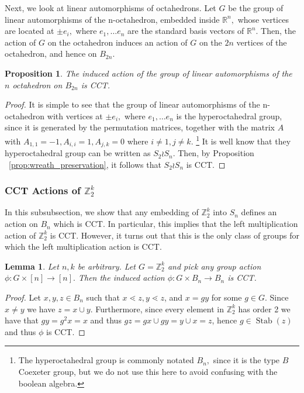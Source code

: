 \documentclass[10 pt]{amsart}
\theoremstyle{plain}
\newtheorem{prop}[thm]{Proposition}
\newtheorem{lem}[thm]{Lemma}
\theoremstyle{definition}
\theoremstyle{remark}
\numberwithin{equation}{section}
\newcommand\sssec{\subsubsection}
\newcommand\BR{{\mathbb R}}
\newcommand\BBZ{{\mathbb Z}}
\newcommand\BZ{{\mathbb Z}}
\def\Stab{\operatorname{Stab}}
\begin{document}
Next, we look at linear automorphisms of octahedrons. Let $G$ be the group of linear automorphisms of the n-octahedron, embedded inside $\BR^n,$ whose vertices are located at $\pm e_i,$ where $e_1,\ldots e_n$ are the standard basis vectors of $\BR^n.$ Then, the action of $G$ on the octahedron induces an action of $G$ on the $2n$ vertices of the octahedron, and hence on $B_{2n}.$

\begin{prop}
The induced action of the group of linear automorphisms of the $n$ octahedron on $B_{2n}$ is CCT.
\end{prop}
\begin{proof}
It is simple to see that the group of linear automorphisms of the n-octahedron with vertices at $\pm e_i,$ where $e_1,\ldots e_n$ is the hyperoctahedral group, since it is generated by the permutation matrices, together with the matrix $A$ with $A_{1,1} = -1,A_{i,i} = 1,A_{j,k} = 0$ where $i \neq 1, j \neq k.$ \footnote{The hyperoctahedral group is commonly notated $B_n,$ since it is the type $B$ Coexeter group, but we do not use this here to avoid confusing with the boolean algebra.} It is well know that they hyperoctahedral group can be written as $S_2 \wr S_n.$ Then, by Proposition ~\ref{prop:wreath_preservation}, it follows that $S_2 \wr S_n$ is CCT.
\end{proof}

\sssec{CCT Actions of $\BZ_2^k$}

In this subsubsection, we show that any embedding of $\BBZ_2^k$ into $S_n$ defines an action on $B_n$ which is CCT. In particular, this implies that the left multiplication action of $\BBZ_2^k$ is CCT. However, it turns out that this is the only class of groups for which the left multiplication action is CCT.

\begin{lem}
\label{lem:order_2_CCT}
Let $n,k$ be arbitrary. Let $G = \BBZ_2^k$ and pick any group action $\phi:G\times [n] \rightarrow [n].$ Then the induced action $\phi:G \times B_n \rightarrow B_n$ is CCT.
\end{lem}

\begin{proof}
Let $x,y,z\in B_n$ such that $x \lessdot z, y \lessdot z$, and  $x = gy$ for some $g\in G$.  Since $x\ne y$ we have $z=x\cup y$.  Furthermore, since every element in $\BBZ_2^k$ has order 2 we have that $gy = g^2x = x$ and thus $gz = gx\cup gy = y\cup x = z$, hence $g\in\Stab(z)$ and thus $\phi$ is CCT.
\end{proof}
%
\end{document}
